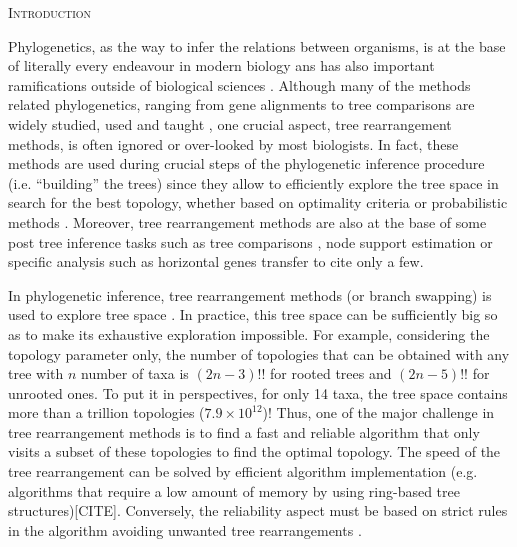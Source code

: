 \documentclass[12pt,letterpaper]{article}
\renewcommand{\section}[1]{%
\bigskip
\begin{center}
\begin{Large}
\normalfont\scshape #1
\medskip
\end{Large}
\end{center}}
\begin{document}
\section{Introduction}

Phylogenetics, as the way to infer the relations between organisms, is at the base of literally every endeavour in modern biology ans has also important ramifications outside of biological sciences \citep[e.g. linguistics;][]{Bouckaert24082012}.
Although many of the methods related phylogenetics, ranging from gene alignments \citep[e.g.][]{Tan01092015} to tree comparisons \citep[e.g.][]{kuhner2015treComparison} are widely studied, used and taught \citep{desalle2012phylogenomics}, one crucial aspect, tree rearrangement methods, is often ignored or over-looked by most biologists.
In fact, these methods are used during crucial steps of the phylogenetic inference procedure (i.e. ``building'' the trees) since they allow to efficiently explore the tree space \citep[see ][]{Sanderson448} in search for the best topology, whether based on optimality criteria \citep[e.g. maximum parsimony; ][]{swofford2003paup} or probabilistic methods \citep[e.g. likelihood or Bayesian; ][]{Stamatakis21012014,Ronquist2012mrbayes}.
Moreover, tree rearrangement methods are also at the base of some post tree inference tasks such as tree comparisons \citep[e.g.][]{allen2001subtree,kuhner2015treComparison}, node support estimation \citep[e.g.][]{goloboff2014bias} or specific analysis such as horizontal genes transfer \citep[e.g.][]{mcfadden1995something,bordewich2005computational} to cite only a few.

In phylogenetic inference, tree rearrangement methods (or branch swapping) is used to explore tree space \citep[i.e. the realm of all the possible trees;][]{page1993islands,morrison2007increasing,Sanderson448}.
In practice, this tree space can be sufficiently big so as to make its exhaustive exploration impossible.
For example, considering the topology parameter only, the number of topologies that can be obtained with any tree with $n$ number of taxa is $(2n-3)!!$ for rooted trees and $(2n-5)!!$ for unrooted ones.
To put it in perspectives, for only 14 taxa, the tree space contains more than a trillion topologies ($7.9\times10^{12}$)!
Thus, one of the major challenge in tree rearrangement methods is to find a fast and reliable algorithm that only visits a subset of these topologies to find the optimal topology. 
The speed of the tree rearrangement can be solved by efficient algorithm implementation (e.g. algorithms that require a low amount of memory by using ring-based tree structures)[CITE].
Conversely, the reliability aspect must be based on strict rules in the algorithm avoiding unwanted tree rearrangements \citep{allen2001subtree,felsenstein2004inferring,lakner2008efficiency,goloboff1993character}.
\end{document}
